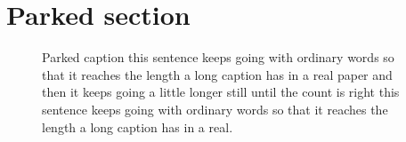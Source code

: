 \section{Parked section}
\begin{figure}[t]
\centering
{}
\caption{Parked caption this sentence keeps going with ordinary words so that it reaches the length a long caption has in a real paper and then it keeps going a little longer still until the count is right this sentence keeps going with ordinary words so that it reaches the length a long caption has in a real.}
\end{figure}
